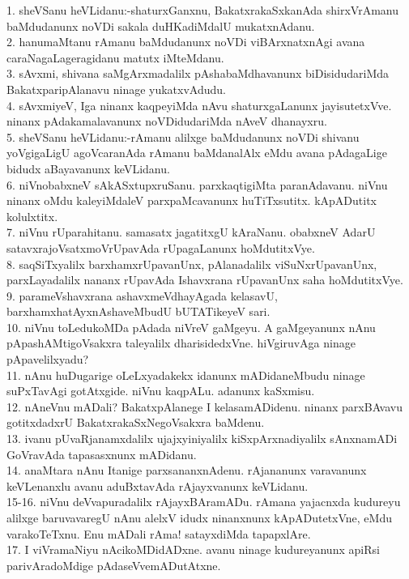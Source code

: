 \documentclass{article}
\begin{document}
1. sheVSanu heVLidanu:-shaturxGanxnu, BakatxrakaSxkanAda shirxVrAmanu baMdudanunx noVDi sakala duHKadiMdalU mukatxnAdanu.\\
2. hanumaMtanu rAmanu baMdudanunx noVDi viBArxnatxnAgi avana caraNagaLageragidanu matutx iMteMdanu.\\
3. sAvxmi, shivana saMgArxmadalilx pAshabaMdhavanunx biDisidudariMda BakatxparipAlanavu ninage yukatxvAdudu.\\
4. sAvxmiyeV, Iga ninanx kaqpeyiMda nAvu shaturxgaLanunx jayisutetxVve. ninanx pAdakamalavanunx noVDidudariMda nAveV dhanayxru.\\
5. sheVSanu heVLidanu:-rAmanu alilxge baMdudanunx noVDi shivanu yoVgigaLigU agoVcaranAda rAmanu baMdanalAlx eMdu avana pAdagaLige bidudx aBayavanunx keVLidanu.\\
6. niVnobabxneV sAkASxtupxruSanu. parxkaqtigiMta paranAdavanu. niVnu ninanx oMdu kaleyiMdaleV parxpaMcavanunx huTiTxsutitx. kApADutitx kolulxtitx.\\
7. niVnu rUparahitanu. samasatx jagatitxgU kAraNanu. obabxneV AdarU satavxrajoVsatxmoVrUpavAda rUpagaLanunx hoMdutitxVye.\\
8. saqSiTxyalilx barxhamxrUpavanUnx, pAlanadalilx viSuNxrUpavanUnx, parxLayadalilx nananx rUpavAda Ishavxrana rUpavanUnx saha hoMdutitxVye.\\
9. parameVshavxrana ashavxmeVdhayAgada kelasavU, barxhamxhatAyxnAshaveMbudU bUTATikeyeV sari.\\
10. niVnu toLedukoMDa pAdada niVreV gaMgeyu. A gaMgeyanunx nAnu pApashAMtigoVsakxra taleyalilx dharisidedxVne. hiVgiruvAga ninage pApavelilxyadu?\\
11. nAnu huDugarige oLeLxyadakekx idanunx mADidaneMbudu ninage suPxTavAgi gotAtxgide. niVnu kaqpALu. adanunx kaSxmisu.\\
12. nAneVnu mADali? BakatxpAlanege I kelasamADidenu. ninanx parxBAvavu gotitxdadxrU BakatxrakaSxNegoVsakxra baMdenu.\\
13. ivanu pUvaRjanamxdalilx ujajxyiniyalilx kiSxpArxnadiyalilx sAnxnamADi GoVravAda tapasasxnunx mADidanu.\\
14. anaMtara nAnu Itanige parxsananxnAdenu. rAjananunx varavanunx keVLenanxlu avanu aduBxtavAda rAjayxvanunx keVLidanu.\\
15-16. niVnu deVvapuradalilx rAjayxBAramADu. rAmana yajacnxda kudureyu alilxge baruvavaregU nAnu alelxV idudx ninanxnunx kApADutetxVne, eMdu varakoTeTxnu. Enu mADali rAma! satayxdiMda tapapxlAre.\\
17. I viVramaNiyu nAcikoMDidADxne. avanu ninage kudureyanunx apiRsi parivAradoMdige pAdaseVvemADutAtxne.\\
\end{document}
